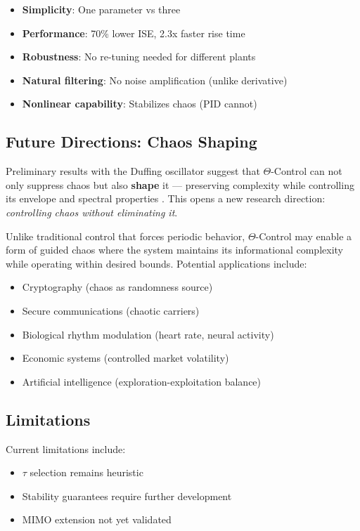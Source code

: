 \documentclass[12pt,a4paper]{article}
\begin{document}
\begin{itemize}
    \item \textbf{Simplicity}: One parameter vs three
    \item \textbf{Performance}: 70\% lower ISE, 2.3x faster rise time
    \item \textbf{Robustness}: No re-tuning needed for different plants
    \item \textbf{Natural filtering}: No noise amplification (unlike derivative)
    \item \textbf{Nonlinear capability}: Stabilizes chaos (PID cannot)
\end{itemize}

\subsection{Future Directions: Chaos Shaping}

Preliminary results with the Duffing oscillator suggest that 
$\Theta$-Control can not only suppress chaos but also 
\textbf{shape} it — preserving complexity while controlling 
its envelope and spectral properties \citep{Ott1990}. This opens 
a new research direction: \textit{controlling chaos without 
eliminating it}.

Unlike traditional control that forces periodic behavior, 
$\Theta$-Control may enable a form of guided chaos where 
the system maintains its informational complexity while 
operating within desired bounds. Potential applications 
include:

\begin{itemize}
    \item Cryptography (chaos as randomness source)
    \item Secure communications (chaotic carriers)
    \item Biological rhythm modulation (heart rate, neural activity)
    \item Economic systems (controlled market volatility)
    \item Artificial intelligence (exploration-exploitation balance)
\end{itemize}

\subsection{Limitations}

Current limitations include:
\begin{itemize}
    \item $\tau$ selection remains heuristic
    \item Stability guarantees require further development
    \item MIMO extension not yet validated
\end{itemize}
\end{document}
